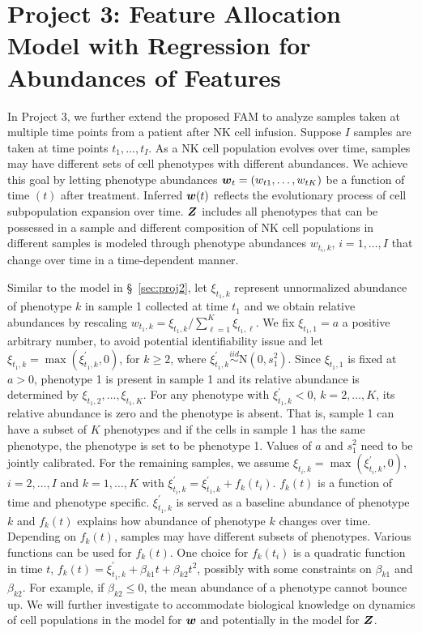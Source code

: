 \documentclass[12pt,]{article}
\newcommand{\N}{ \mathcal{N} }
\newcommand{\iid}{\overset{iid}{\sim}}
\def\N{\text{N}}
\newcommand{\bZ}{\mbox{\boldmath $Z$}}
\newcommand{\bw}{\mbox{\boldmath $w$}}
\begin{document}
\section{Project 3: Feature Allocation Model with Regression for Abundances of
Features}\label{sec:proj3}
In Project 3, we further extend the proposed FAM to analyze samples taken at
multiple time points from a patient after NK cell infusion. Suppose $I$ samples
are taken at time points $t_1, \ldots, t_I$.   As a NK cell population evolves
over time, samples may have different sets of cell phenotypes with different
abundances.    We achieve this goal by letting phenotype abundances
$\bw_{t}=(w_{t1}, \ldots, w_{tK})$ be a function of time $(t)$ after treatment.
Inferred $\bw(t)$ reflects the evolutionary process of cell subpopulation
expansion over time.   $\bZ$ includes all phenotypes that can be possessed in a
sample and different composition of NK cell populations in different samples is
modeled through  phenotype abundances $w_{t_i, k}$, $i=1, \ldots, I$ that
change over time in a time-dependent manner.


Similar to the model in \S~\ref{sec:proj2}, let $\xi_{t_1,k}$ represent
unnormalized abundance of phenotype $k$ in sample 1 collected at time $t_1$ and
we obtain relative abundances by rescaling $w_{t_1,k}=
\xi_{t_1,k}/\sum_{\ell=1}^K \xi_{t_1, \ell}$.  We fix $\xi_{t_1,1}=a$ a
positive arbitrary number, to avoid potential identifiability issue and let
$\xi_{t_1,k} = \max(\xi^\prime_{t_1,k}, 0)$, for $k\ge 2$, where
$\xi^\prime_{t_1,k} \iid \N(0, s^2_1)$.  Since $\xi_{t_1, 1}$ is fixed at
$a>0$, phenotype 1 is present in sample 1 and its relative abundance is
determined by $\xi_{t_1, 2}, \ldots, \xi_{t_1, K}$.  For any phenotype with
$\xi^\prime_{t_1, k} < 0$, $k=2, \ldots, K$, its relative abundance is zero and
the phenotype is absent.  That is, sample 1 can have a subset of $K$ phenotypes
and if the cells in sample 1 has the same phenotype, the phenotype is set to be
phenotype 1. Values of $a$ and $s^2_1$ need to be jointly calibrated. For the
remaining samples, we assume $\xi_{t_i,k} = \max(\xi^\prime_{t_i,k}, 0)$, $i=2,
\ldots, I$ and $k=1, \ldots, K$ with $\xi^\prime_{t_i,k} = \xi^\prime_{t_1, k}
+ f_k(t_i)$. $f_k(t)$ is a function of time and phenotype specific.
$\xi^\prime_{t_1, k}$ is served as a baseline abundance of phenotype $k$ and
$f_k(t)$ explains how abundance of phenotype $k$ changes over time.
Depending on $f_k(t)$, samples may have different subsets of phenotypes.
Various functions can be used for $f_k(t)$.  One choice for $f_k(t_i)$ is a
quadratic function in time $t$, $f_k(t) = \xi^\prime_{t_1,k} + \beta_{k1}t +
\beta_{k2}t^2$, possibly with some constraints on $\beta_{k1}$ and
$\beta_{k2}.$  For example, if $\beta_{k2} \leq 0$, the mean abundance of a
phenotype cannot bounce up.  We will further investigate to accommodate
biological knowledge on dynamics of cell populations in the model for $\bw$ and
potentially in the model for $\bZ$.   
\end{document}
